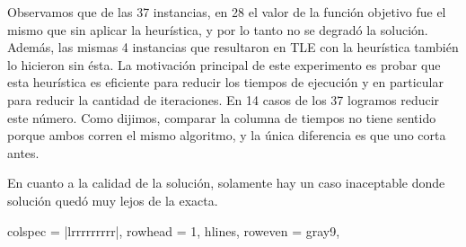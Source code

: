 Observamos que de las 37 instancias, en 28 el valor de la función objetivo fue el mismo que sin aplicar la heurística, y por lo tanto no se degradó la solución. Además, las mismas 4 instancias que resultaron en TLE con la heurística también lo hicieron sin ésta. La motivación principal de este experimento es probar que esta heurística es eficiente para reducir los tiempos de ejecución y en particular para reducir la cantidad de iteraciones. En 14 casos de los 37 logramos reducir este número. Como dijimos, comparar la columna de tiempos no tiene sentido porque ambos corren el mismo algoritmo, y la única diferencia es que uno corta antes. 

En cuanto a la calidad de la solución, solamente hay un caso inaceptable donde solución quedó muy lejos de la exacta.  

\begin{landscape}
\begin{longtblr}[
  caption = {Comparación de Generación de Columnas con y sin terminación temprana},
]{
  colspec = {|lrrrrrrrrr|},
  rowhead = 1,
  hlines,
  row{even} = {gray9},
} 


\end{longtblr}
\end{landscape}
